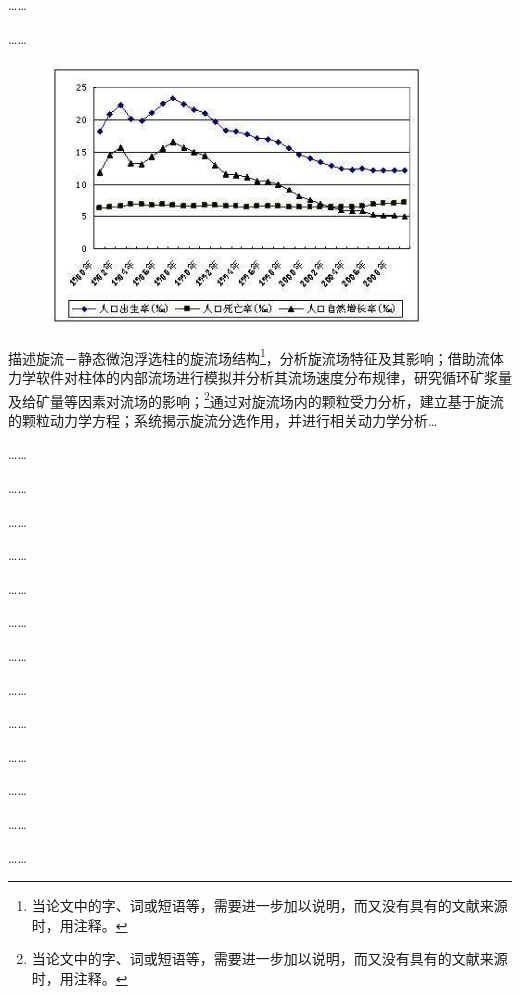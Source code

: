 ……

……

\begin{figure}
    \centering
    \includegraphics[width=10cm]{Figures/example_fig_1.png}
    \label{fig: fig_1}
\end{figure}

描述旋流－静态微泡浮选柱的旋流场结构\footnote{当论文中的字、词或短语等，需要进一步加以说明，而又没有具有的文献来源时，用注释。}，分析旋流场特征及其影响；借助流体力学软件对柱体的内部流场进行模拟并分析其流场速度分布规律，研究循环矿浆量及给矿量等因素对流场的影响；\footnote{当论文中的字、词或短语等，需要进一步加以说明，而又没有具有的文献来源时，用注释。}通过对旋流场内的颗粒受力分析，建立基于旋流的颗粒动力学方程；系统揭示旋流分选作用，并进行相关动力学分析…

……

……

……

……

……

……

……

……

……

……

……

……

……
